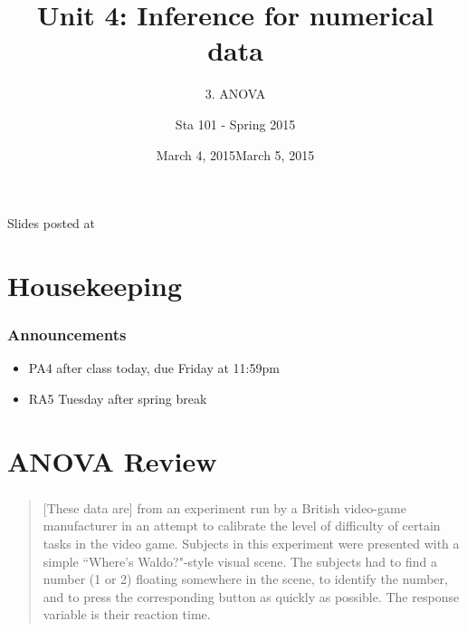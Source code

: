 \documentclass[slidestop,compress,mathserif,12pt,t,professionalfonts,xcolor=table]{beamer}
\title{Unit 4: Inference for numerical data}
\subtitle{3. ANOVA}
\author{Sta 101 - Spring 2015}
\date{March 4, 2015}
\date{March 5, 2015}
\institute{Duke University, Department of Statistical Science}
\begin{document}


\begin{frame}[plain]

\titlepage
\vfill
{\scriptsize {} \hfill Slides posted at  \webLink{\CourseSite}{\CourseSite}}
\addtocounter{framenumber}{-1} 

\end{frame}


\section{Housekeeping}


\begin{frame}
\frametitle{Announcements}

\begin{itemize}




\item PA4 after class today, due Friday at 11:59pm

\item RA5 Tuesday after spring break

\end{itemize}

\end{frame}


\section{ANOVA Review}


\begin{frame}
  \frametitle{}

\vfill

\begin{quote} 
[These data are] from an experiment run by a British video-game manufacturer in an attempt to calibrate the level of difficulty of certain tasks in the video game. Subjects in this experiment were presented with a simple ``Where's Waldo?"-style visual scene. The subjects had to find a number (1 or 2) floating somewhere in the scene, to identify the number, and to press the corresponding button as quickly as possible. The response variable is their reaction time.
\end{quote}

\vfill


\end{frame}
\end{document}
